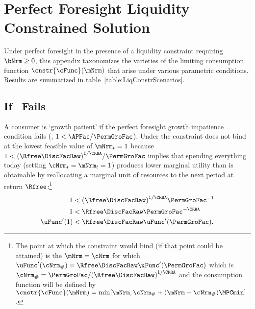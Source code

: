 \documentclass[\econtexRoot/BufferStockTheory]{subfiles}
\begin{document}
\let\TableWidth\relax
{\newlength\TableWidth}

\hypertarget{ApndxLiqConstr}{}
\section{Perfect Foresight Liquidity Constrained Solution}\label{sec:ApndxLiqConstr}

Under perfect foresight in the presence of a liquidity constraint requiring $\bNrm \geq 0$, this appendix taxonomizes the varieties of the limiting consumption function $\cnstr{\cFunc}(\mNrm)$ that arise under various parametric conditions.  Results are summarized in table~\ref{table:LiqConstrScenarios}.




\subsection{If \GICRaw~Fails}

A consumer is `growth patient' if the perfect foresight growth
impatience condition fails (\cncl{\GICRaw}, $1 < \APFac/\PermGroFac$).  Under
\cncl{\GICRaw} the constraint does not bind at the lowest feasible value of $\mNrm_{t}=1$ because
$1 < {(\Rfree\DiscFacRaw)}^{1/\CRRA}/\PermGroFac$ implies that spending
everything today (setting $\cNrm_{t}=\mNrm_{t}=1$) produces lower
marginal utility than is obtainable by reallocating a marginal unit of
resources to the next period at return $\Rfree$:\footnote{The point at
  which the constraint would bind (if that point could be attained) is
  the $\mNrm=\cNrm$ for which $\uFunc^{\prime}(\cNrm_{\#}) = \Rfree
  \DiscFacRaw \uFunc^{\prime}(\PermGroFac)$ which is $\cNrm_{\#} =
  \PermGroFac/{(\Rfree \DiscFacRaw)}^{1/\CRRA}$ and the consumption function
  will be defined by
  $\cnstr{\cFunc}(\mNrm)=\min[\mNrm,\cNrm_{\#}+(\mNrm-\cNrm_{\#})\MPCmin
  ]$.}
\begin{equation}\begin{gathered}\begin{aligned}
  1  & < {(\Rfree \DiscFacRaw)}^{1/\CRRA}\PermGroFac^{-1}    \notag
  \\ 1  & < \Rfree \DiscFacRaw \PermGroFac^{-\CRRA} \notag
  \\  \uFunc^{\prime}(1)  & < \Rfree \DiscFacRaw \uFunc^{\prime}(\PermGroFac)   \label{eq:EulerGICRawFailsEnd}.
\end{aligned}\end{gathered}\end{equation}
\end{document}
